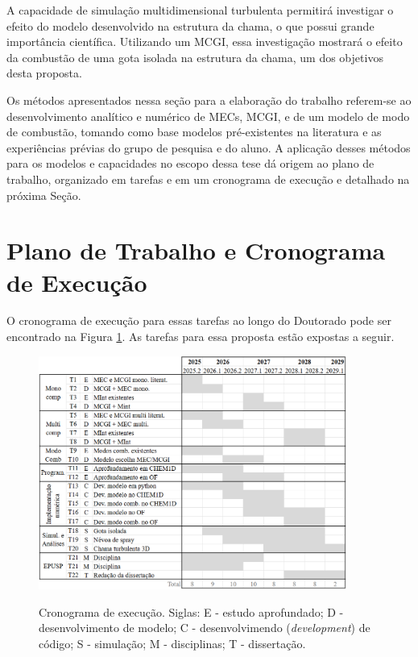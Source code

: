 A capacidade de simulação multidimensional turbulenta permitirá investigar o efeito do modelo desenvolvido na estrutura da chama, o que possui grande importância científica.
Utilizando um MCGI, essa investigação mostrará o efeito da combustão de uma gota isolada na estrutura da chama, um dos objetivos desta proposta.

Os métodos apresentados nessa seção para a elaboração do trabalho  referem-se ao desenvolvimento analítico e numérico de MECs, MCGI, e de um modelo de modo de combustão, tomando como base modelos pré-existentes na literatura e as experiências prévias do grupo de pesquisa e do aluno.
A aplicação desses métodos para os modelos e capacidades no escopo dessa tese dá origem ao plano de trabalho, organizado em tarefas e em um cronograma de execução e detalhado na próxima Seção.

\section{Plano de Trabalho e Cronograma de Execução}

O cronograma de execução para essas tarefas ao longo do Doutorado pode ser encontrado na Figura \ref{fig:cronograma}.
As tarefas para essa proposta estão expostas a seguir.

\begin{figure}[ht]
    \centering
    \caption{Cronograma de execução. Siglas: E - estudo aprofundado; D - desenvolvimento de modelo; C - desenvolvimendo (\emph{development}) de código; S - simulação; M - disciplinas; T - dissertação.}
    \includegraphics[width=0.9\textwidth]{30_images/cronograma-3.png}
    \label{fig:cronograma}
\end{figure}


